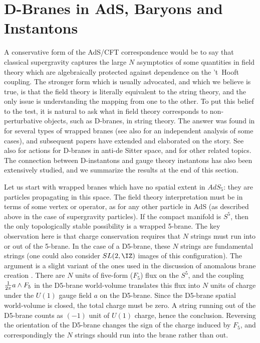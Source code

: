 \section{D-Branes in AdS, Baryons and Instantons}
\label{baryons}

A conservative form of the AdS/CFT correspondence would be to say that
classical supergravity captures the large $N$ asymptotics of some
quantities in field theory which are algebraically protected against
dependence on the 't~Hooft coupling.  The stronger form which is usually
advocated, and which we believe is true, is that the field theory is
literally equivalent to the string theory, and the only issue is
understanding the mapping from one to the other.  To put this belief to the
test, it is natural to ask what in field theory corresponds to
non-perturbative objects, such as D-branes, in string theory.  The answer
was found in \cite{Witten:1998xy} for several types of wrapped branes (see
also \cite{Gross:1998gk} for an independent analysis of some cases), and
subsequent papers \cite{Brandhuber:1998xy,Imamura:1998hf,Imamura:1998gk,
Aharony:1998qu,Callan:1998iq,
Witten:1998cd,Morrison:1998cs,Alishahiha:1998ib,Gukov:1998kn,
Craps:1999nc,Callan:1999zf} have extended and elaborated on the story.  See
also \cite{Metsaev:1998hf,Claus:1999fh} for actions for D-branes in anti-de
Sitter space, and \cite{Bilal:1998ck,Pasti:1998tc} for other related
topics.  The connection between D-instantons and gauge theory instantons
has also been extensively studied, and we summarize the results at the end
of this section.

Let us start with wrapped branes which have no spatial extent in
$AdS_5$: they are particles propagating in this space.  The
field theory interpretation must be in terms of some vertex or
operator, as for any other particle in AdS (as described above in the
case of supergravity particles).  If
the compact manifold is $S^5$, then the only topologically stable
possibility is a wrapped 5-brane.  The key observation here is that
charge conservation requires that $N$ strings must run into or out of the
5-brane.  In the case of a D5-brane, these $N$ strings are fundamental
strings (one could also consider $SL(2,\IZ)$ images of this
configuration).  The argument is a slight variant of the ones used in the
discussion of anomalous brane creation
\cite{Hanany:1997ie,Bachas:1997ui,Danielsson:1997wq}.  There are $N$ units
of five-form ($F_5$) flux on the $S^5$, and the coupling ${1 \over
2\pi} a \wedge F_5$ in the D5-brane world-volume translates this flux
into $N$ units of charge under the $U(1)$ gauge field $a$ on the
D5-brane.  Since the D5-brane spatial world-volume is closed, the
total charge must be zero.  A string running out of the D5-brane
counts as $(-1)$ unit of $U(1)$ charge, hence the conclusion.
Reversing the orientation of the D5-brane changes the sign of the
charge induced by $F_5$, and correspondingly the $N$ strings should
run into the brane rather than out.

